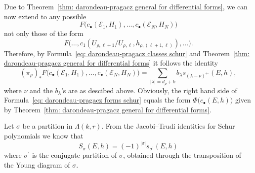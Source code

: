 \documentclass[a4paper]{amsart}
\theoremstyle{plain}%
\theoremstyle{definition}
\theoremstyle{remark}
\begin{document}
Due to Theorem~\ref{thm: darondeau-pragacz general for differential forms}, we can now extend \cite[Formula~{(6)}]{Fag20} to any possible
\[
F\bigl(c_{\bullet}(\mathcal{E}_1,H_1),\dots,c_{\bullet}(\mathcal{E}_N,H_N)\bigr)
\]
not only those of the form
\[
F\bigl(\dots,c_1(U_{\rho,\ell+1}/U_{\rho,\ell},h_{\rho,(\ell+1,\ell)}),\dots\bigr).
\]
Therefore, by Formula~\ref{eq: darondeau-pragacz classes schur} and Theorem~\ref{thm: darondeau-pragacz general for differential forms} it follows the identity
\begin{equation}\label{eq: darondeau-pragacz forms schur}
	(\pi_{\rho})_{*} F\bigl(c_{\bullet}(\mathcal{E}_1,H_1),\dots,c_{\bullet}(\mathcal{E}_N,H_N)\bigr) = \sum_{|\lambda| = d_\rho + k} b_{\lambda} s_{(\lambda-\nu)^{\leftarrow}}(E,h) ,
\end{equation}
where $ \nu $ and the $ b_{\lambda} $'s are as descibed above.
Obviously, the right hand side of Formula~\eqref{eq: darondeau-pragacz forms schur} equals the form $ \Phi\big(c_{\bullet}(E,h)\big) $ given by Theorem~\ref{thm: darondeau-pragacz general for differential forms}.

\medskip
Let $ \sigma $ be a partition  in $ \Lambda(k,r) $.
From the Jacobi--Trudi identities for Schur polynomials we know that
\begin{equation}\label{eq:relation schur vs generalized schur}
	S_{\sigma}(E,h) = (-1)^{|\sigma|} s_{\sigma^{\prime}}(E,h)
\end{equation}
where $ \sigma^{\prime} $ is the conjugate partition of $ \sigma $, obtained through the transposition of the Young diagram of $ \sigma $.
\end{document}
